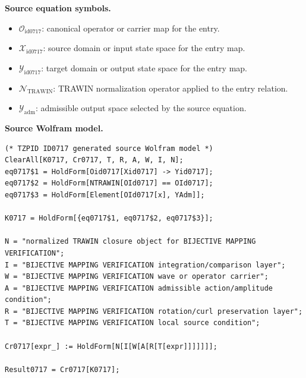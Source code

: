 \begin{minipage}[t]{0.49\linewidth}
\begingroup
\small
\raggedright
\textbf{Source equation symbols.}\par
\begin{itemize}[leftmargin=1.35em,itemsep=1pt,topsep=1pt,parsep=0pt]
    \item $\mathcal{O}_{\mathrm{id0717}}$: canonical operator or carrier map for the entry.
    \item $\mathcal{X}_{\mathrm{id0717}}$: source domain or input state space for the entry map.
    \item $\mathcal{Y}_{\mathrm{id0717}}$: target domain or output state space for the entry map.
    \item $\mathcal{N}_{\mathrm{TRAWIN}}$: TRAWIN normalization operator applied to the entry relation.
    \item $\mathcal{Y}_{\mathrm{adm}}$: admissible output space selected by the source equation.
\end{itemize}
\endgroup
\end{minipage}\hfill
\begin{minipage}[t]{0.47\linewidth}
\begingroup
\scriptsize
\raggedright
\textbf{Source Wolfram model.}\par
\begin{Verbatim}[fontsize=\tiny,breaklines=true,breakanywhere=true]
(* TZPID ID0717 generated source Wolfram model *)
ClearAll[K0717, Cr0717, T, R, A, W, I, N];
eq0717$1 = HoldForm[Oid0717[Xid0717] -> Yid0717];
eq0717$2 = HoldForm[NTRAWIN[OId0717] == OId0717];
eq0717$3 = HoldForm[Element[OId0717[x], YAdm]];

K0717 = HoldForm[{eq0717$1, eq0717$2, eq0717$3}];

N = "normalized TRAWIN closure object for BIJECTIVE MAPPING VERIFICATION";
I = "BIJECTIVE MAPPING VERIFICATION integration/comparison layer";
W = "BIJECTIVE MAPPING VERIFICATION wave or operator carrier";
A = "BIJECTIVE MAPPING VERIFICATION admissible action/amplitude condition";
R = "BIJECTIVE MAPPING VERIFICATION rotation/curl preservation layer";
T = "BIJECTIVE MAPPING VERIFICATION local source condition";

Cr0717[expr_] := HoldForm[N[I[W[A[R[T[expr]]]]]]];

Result0717 = Cr0717[K0717];
\end{Verbatim}
\endgroup
\end{minipage}

